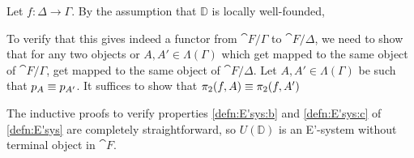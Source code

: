 \begin{constr}
Let $f:\Delta\to\Gamma$. By the assumption that $\mathbb{D}$ is locally well-founded,


To verify that this gives indeed a functor from $\cat{F}/\Gamma$ to
$\cat{F}/\Delta$, we need to show that for any two objects or $A,A'\in\Lambda(\Gamma)$
which get mapped to the same object of $\cat{F}/\Gamma$, get mapped to the
same object of $\cat{F}/\Delta$. Let $A,A'\in\Lambda(\Gamma)$ be such that
$p_A\equiv p_{A'}$. It suffices to show that $\pi_2(f,A)\equiv\pi_2(f,A')$

The inductive proofs to verify properties
\autoref{defn:E'sys:b} and \autoref{defn:E'sys:c} of \autoref{defn:E'sys} are
completely straightforward, so $U(\mathbb{D})$ is an E'-system without terminal
object in $\cat{F}$.
\begin{comment}
Finally, we need to verify that the structure we've defined satisfies the properties
of being an E'-system without terminal object. We go through them systematically,
following the same order as in \autoref{defn:E'sys}:
\begin{enumerate}[label=(\alph*)]
\item This property holds by definition.
\item Let $\Gamma\in\cat{C}$. We will prove by induction on $A\in\cat{F}/\Gamma$
that $(\catid{\Gamma})_\ast(A)\jdeq A$ and that $\pi_2(\catid{\Gamma},A)\jdeq \catid{\ctxext{\Gamma}{A}}$.
Note that these properties hold by definition for $A\jdeq\catid{\Gamma}$. For the
inductive step, assume that $A\in\cat{F}/\Gamma$ is such that
$(\catid{\Gamma})_\ast(A)\jdeq A$ and $\pi_2(\catid{\Gamma},A)\jdeq
\catid{\ctxext{\Gamma}{A}}$ and let $B\in\mathrm{Ty}(\ctxext{\Gamma}{A})$. Then
we have
\begin{align*}
(\catid{\Gamma})_\ast(A\circ p_B) & \jdeq (\catid{\Gamma})_\ast(A)\circ \pi_2(\catid{\Gamma},A)_\ast(p_B) \\
& \jdeq A\circ p_B
\end{align*}
Also, we have
\begin{align*}
\pi_2(\catid{\Gamma},A\circ p_B) & \jdeq \pi_2(\pi_2(\catid{\Gamma},A),p_B) \\
& \jdeq \pi_2(\catid{\ctxext{\Gamma}{A}},p_B) \\
& \jdeq \catid{\ctxext{{\Gamma}{A}}{B}}
\end{align*}
\item Let $f:\Delta\to \Gamma$ and $g:X\to \Delta$. We will prove by induction
on $A\in\cat{F}/\Gamma$ that $(f\circ g)_\ast(A)\jdeq g_\ast(f_\ast(A))$ and

\end{comment}
\end{constr}
